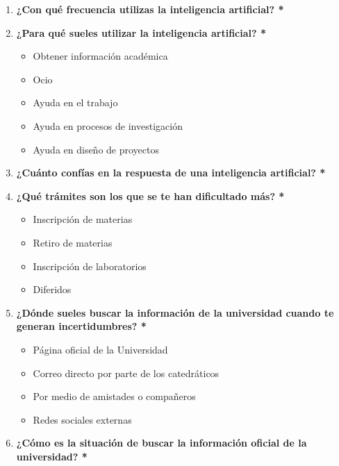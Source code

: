 {{\begin{enumerate}[label=\textbf{\arabic*.}]
            \item \textbf{¿Con qué frecuencia utilizas la inteligencia artificial? *} 

            \item \textbf{¿Para qué sueles utilizar la inteligencia artificial? *}
            \begin{itemize}[label=$\square$]
                \item Obtener información académica
                \item Ocio
                \item Ayuda en el trabajo
                \item Ayuda en procesos de investigación
                \item Ayuda en diseño de proyectos
            \end{itemize}

            \item \textbf{¿Cuánto confías en la respuesta de una inteligencia artificial? *}

            \item \textbf{¿Qué trámites son los que se te han dificultado más? *}
            \begin{itemize}[label=$\square$]
                \item Inscripción de materias
                \item Retiro de materias
                \item Inscripción de laboratorios
                \item Diferidos
            \end{itemize}

            \item \textbf{¿Dónde sueles buscar la información de la universidad cuando te generan incertidumbres? *}
            \begin{itemize}[label=$\square$]
                \item Página oficial de la Universidad
                \item Correo directo por parte de los catedráticos
                \item Por medio de amistades o compañeros
                \item Redes sociales externas
            \end{itemize}

            \item \textbf{¿Cómo es la situación de buscar la información oficial de la universidad? *}


\end{enumerate}}}

